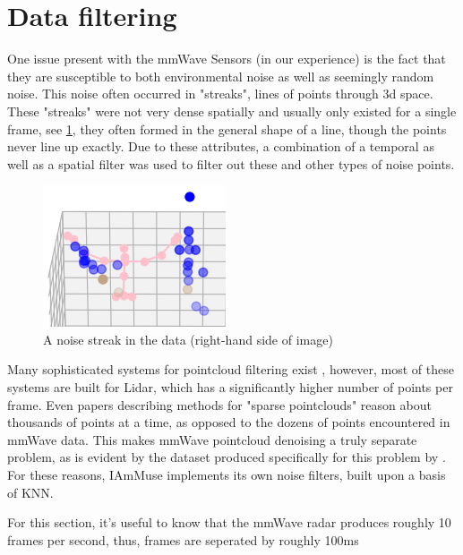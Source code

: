 \section{Data filtering}
\label{section: tracking method - data filtering}

One issue present with the mmWave Sensors (in our experience) is the fact that they are susceptible to both environmental noise as well as seemingly random noise. 
This noise often occurred in "streaks", lines of points through 3d space. 
These "streaks" were not very dense spatially and usually only existed for a single frame, see \cref{figure: noise streak}, they often formed in the general shape of a line, though the points never line up exactly.
Due to these attributes, a combination of a temporal as well as a spatial filter was used to filter out these and other types of noise points.

\begin{figure}
    \centering
    \includegraphics[width=0.5\linewidth]{figures/internal data/noise streak.png}
    \caption{A noise streak in the data (right-hand side of image)}
    \label{figure: noise streak}
\end{figure}

Many sophisticated systems for pointcloud filtering exist \cite{ester1996dbscan, faisal2017density}, however, most of these systems are built for Lidar, which has a significantly higher number of points per frame. 
Even papers describing methods for "sparse pointclouds" reason about thousands of points at a time, as opposed to the dozens of points encountered in mmWave data.
This makes mmWave pointcloud denoising a truly separate problem, as is evident by the dataset produced specifically for this problem \cite{farella2019sparse} by \citeauthor{farella2019sparse}.
For these reasons, IAmMuse implements its own noise filters, built upon a basis of KNN.

For this section, it's useful to know that the mmWave radar produces roughly 10 frames per second, thus, frames are seperated by roughly 100ms

